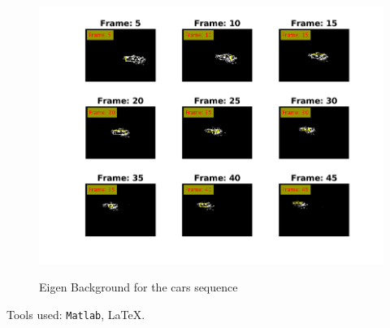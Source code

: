 \documentclass[a4paper,12pt]{article}
\begin{document}
\begin{figure}[Ht]
\centering
\includegraphics{../Videos/a5_eigen.png}
\label{fig:svgCars}
\caption{Eigen Background for the cars sequence}
\end{figure}

\vfill
\noindent Tools used: \texttt{Matlab}, \LaTeX{}.
\end{document}
